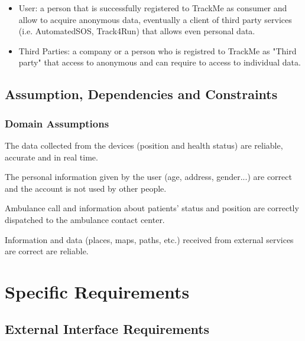 \documentclass[a4paper]{article}
\begin{document}
    
    \begin{itemize}
        \item User:  a person that is successfully registered to TrackMe as consumer and allow to acquire anonymous data, eventually a client of third party services (i.e. AutomatedSOS, Track4Run) that allows even personal data.
        
        \item Third Parties:  a company or a person who is registred to TrackMe as "Third party" that access to anonymous and can require to access to individual data.
        
    \end{itemize}
    
    \subsection{Assumption, Dependencies and Constraints}
    
    \subsubsection{Domain Assumptions}
    
    
    \begin{enumerate}[label={[D.\arabic*]}]
        
        \item The data collected from the devices (position and health status) are reliable, accurate and in real time.
        \item The personal information given by the user (age, address, gender...) are correct and the account is not used by other people. 
        \item Ambulance call and information about patients' status and position are correctly dispatched to the ambulance contact center.
        \item Information and data (places, maps, paths, etc.) received from external services are correct are reliable.
        
    \end{enumerate}
    
    
    \section{Specific Requirements}
    
    \subsection{External Interface Requirements}
    
\end{document}
